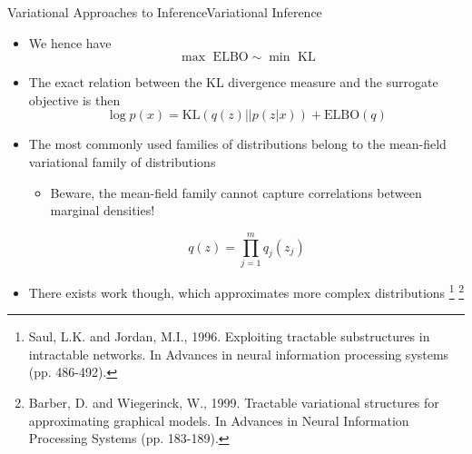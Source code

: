 \documentclass[AERbeamer%
              ,optEnglish%
              ,optBiber%
              ,optBibstyleAlphabetic%
              ,optBeamerClassicFormat%
              ]{AERlatex}%
\begin{document}
\begin{frame}[c]{Variational Approaches to Inference}{Variational Inference}
    \centering
    \begin{itemize}
        \item We hence have
        \begin{equation*}
            \max \text{ ELBO} \sim \min \text{ KL}
        \end{equation*}
        \item The exact relation between the KL divergence measure and the surrogate objective is then
        \begin{equation*}
            \log p(x) = \text{KL}(q(z) || p(z|x)) + \text{ELBO}(q)
        \end{equation*}
        \item The most commonly used families of distributions belong to the mean-field variational family of distributions
        \begin{itemize}
            \item Beware, the mean-field family cannot capture correlations between marginal densities!
        \end{itemize}
        \begin{equation*}
            q(z) = \prod^{m}_{j=1} q_{j}(z_{j})
        \end{equation*}
        \item There exists work though, which approximates more complex distributions \footnote{Saul, L.K. and Jordan, M.I., 1996. Exploiting tractable substructures in intractable
                                                                                                networks. In Advances in neural information processing systems (pp. 486-492).}
                                                                                      \footnote{Barber, D. and Wiegerinck, W., 1999. Tractable variational structures for approximating
                                                                                                graphical models. In Advances in Neural Information Processing Systems (pp. 183-189).}
    \end{itemize}
\end{frame}
\end{document}
